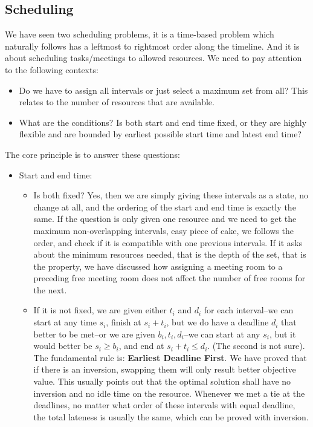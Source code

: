 \documentclass[../main.tex]{subfiles}
\begin{document}
\subsection{Scheduling}
We have seen two scheduling problems, it is a time-based problem which naturally follows has a leftmost to rightmost order along the timeline. And it is about scheduling tasks/meetings to allowed resources. We need to pay attention to the following contexts:
\begin{itemize}
    \item Do we have to assign all intervals or just select a maximum set from all? This relates to the number of resources that are available.  
    \item What are the conditions? Is both start and end time fixed, or they are highly flexible and are bounded by earliest possible start time and latest end time?
\end{itemize}
The core principle is to answer these questions:
\begin{itemize}
    \item Start and end time: 
    \begin{itemize}
        \item Is both fixed? Yes, then we are simply giving these intervals as a state, no change at all, and the ordering of the start and end time is exactly the same. If the question is only given one resource and we need to get the maximum non-overlapping intervals, easy piece of cake, we follows the order, and check if it is compatible with one previous intervals. If it asks about the minimum resources needed, that is the depth of the set, that is the property, we have discussed how assigning a meeting room to a preceding free meeting room does not affect the number of free rooms for the next. 
        \item If it is not fixed, we are given either $t_i$ and $d_i$ for each interval--we can start at any time $s_i$, finish at $s_i+t_i$, but we do have a deadline $d_i$ that better to be met--or we are given $b_i, t_i, d_i$--we can start at any $s_i$, but it would better be $s_i\geq b_i$, and end at $s_i+t_i\leq d_i$. (The second is not sure). The fundamental rule is: \textbf{Earliest Deadline First}. We have proved that if there is an inversion, swapping them will only result better objective value. This usually points out that the optimal solution shall have no inversion and no idle time on the resource. Whenever we met a tie at the deadlines, no matter what order of these intervals with equal deadline, the total lateness is usually the same, which can be proved with inversion. 
    \end{itemize}
\end{itemize}
\end{document}
